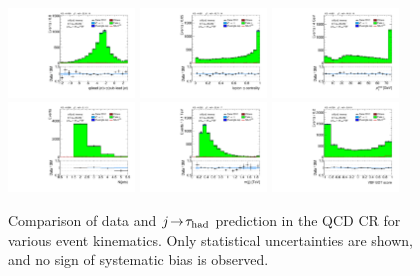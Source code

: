 \begin{figure}[!htpb]
  \includegraphics[width=0.30\textwidth]{figures/analysis/vbf-QCDCR/jets-etaprod}
  \includegraphics[width=0.30\textwidth]{figures/analysis/vbf-QCDCR/lep-eta-centrality}
  \includegraphics[width=0.30\textwidth]{figures/analysis/vbf-QCDCR/system-pt} \\
  \includegraphics[width=0.30\textwidth]{figures/analysis/vbf-QCDCR/n-jets30}
  \includegraphics[width=0.30\textwidth]{figures/analysis/vbf-QCDCR/dijet-m-veryhigh}
  \includegraphics[width=0.30\textwidth]{figures/analysis/vbf-QCDCR/BDTEve-VBF} \\
  \caption{Comparison of data and $j\!\rightarrow\!\tau_\text{had}$ prediction in the QCD CR for various event kinematics. Only statistical uncertainties are shown, and no sign of systematic bias is observed.}
  \label{fig:backgrounds-QCDCR-jets}
\end{figure}


